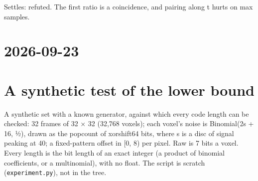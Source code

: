 Settles: refuted. The first ratio is a coincidence, and pairing along t hurts on max samples.

\section{\texorpdfstring{2026-09-23}{2026-09-23}}

\section{\texorpdfstring{A synthetic test of the lower bound}{A synthetic test of the lower bound}}

A synthetic set with a known generator, against which every code length can be checked: 32 frames of 32 × 32 (32,768 voxels); each voxel's noise is Binomial(2s + 16, ½), drawn as the popcount of xorshift64 bits, where s is a disc of signal peaking at 40; a fixed-pattern offset in [0, 8) per pixel. Raw is 7 bits a voxel. Every length is the bit length of an exact integer (a product of binomial coefficients, or a multinomial), with no float. The script is scratch (\texttt{experiment.\allowbreak{}py}), not in the tree.

